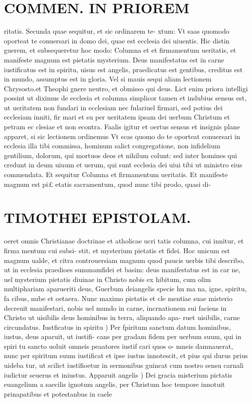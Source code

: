 \documentclass{article}
\begin{document}
\begin{pages}
\section*{COMMEN. IN PRIOREM }
\marginpar{[ p.90 ]}\pstart ritatis. Secunda quae sequitur, et sic ordinarem te- xtum: Vt saas quomodo oporteat te conuersari in domo dei, quae est ecclesia dei uiuentis. Hic distin guerem, et subsequeretur hoc modo: Columna et et firmamentum ueritatis, et manifeste magnum est pietatis mysterium. Deus manifestatus est in carne iustificatus est in spiritu, uisus est angelis, praedicatus est gentibus, creditus est in mundo, assumptus est in gloria. Vel si mauis sequi aliam lectionem Chrysosto.et Theophi gnere neutro, et obmisso qui deus. Lict enim priora intelligi possint ut diximus de ecclesia et columna simplicor tamen et indubius sensus est, ut ueritatem non fundari in ecclesiam nec fulariuel firmari, sed potius dei ecclesiam inniti, fir mari et su per ueritatem ipsam dei uerbum Christum et petram ec clesiae et non econtra. Faalis igitur et oertus sensus et insignis plane apparet, si sic lectionem ordinemus Vt scas quomo do te oporteat conuersari in ecclesia illa tibi commissa, hominum salict congregatione, non infidelium gentilium, dolorum, qui mortuos deos et nihilum colunt: sed inter homines qui credunt in deum uiuum et uerum, qui sunt ecclesia dei uiui tibi ut ministro eius commendata. Et sequitur Columna et firmamentum ueritatis. Et manifeste magnum est pi£ etatis sacramentum, quod nunc tibi prodo, quasi di-  \pend
\section*{TIMOTHEI EPISTOLAM. }
\marginpar{[ p.91 ]}\pstart oeret omnis Christianae doctrinae et atholicae ucri tatis columna, cui innitur, et firma mentum cui subsi- stit, et mysterium pietatis et fidei. Hoc unicum est magnum ualde, et citra controuersiam magnum quod paucis uerbis tibi describo, ut in ecclesia praedioes summamfidei et basim: deus manifestatus est in car ne, uel mysterium pietatis diuinae in Christo nobis ex hibitum, cum olim multiphariam aparueriti deus, Guerbum deiangelis specie hu ma na, igne, spiritu, fa cibus, nube et oetaera. Nunc maximo pietatis et cle mentiae suae misterio decreuit manifestari, nobis uel mundo in carne, incrnationem sui faciens in Christo ut uisibilis deus hominibus in terra, aliquando apa- ruet uisibilis, carne circundatus.  \pend\pstart Iustficatus in spiritu ) Per fpiritum sanctum datum hominibus, iustus, deus aparuit, ut iustifi- cans per gradam fidem per uerbum suum, qui in spiri tu sancto uoluit omneis peaatores iustif cari quos o- mneis damnauerat, nunc per spiritum suum iustificat et ipse iustus innotescit, et pius qui durus prius uideba tur, ut scilict iustifioetur in sermonibus guincat cum nostro sensu carnali iudictur seuerus et iniustus. Apparuit angelis ) Dei gracia misterium pictatis euangelium a saecilis ignotum angelis, per Christum hoc tempore innotuit prinapatibus et potestanbus in caele  \pend

\end{pages}
\end{document}
